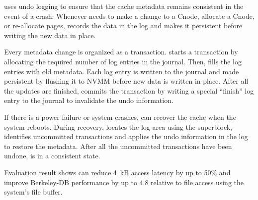 \CChell{} uses undo logging to ensure that the cache metadata remains
consistent in the event of a crash.  Whenever \drv{} needs to make
a change to a Cnode, allocate a Cnode, or re-allocate pages,
\drv{} records the data in the log and makes it persistent before writing
the new data in place.

Every metadata change is organized as a transaction.  \Drv{} starts
a transaction by allocating the required number of log entries in the journal.
Then, \drv{} fills the log entries with old metadata.
Each log entry is written to the journal and made persistent by flushing it
to NVMM before new data is written in-place.
After all the updates are finished, \drv{} commits the transaction
by writing a special ``finish'' log entry to the journal to invalidate the undo information.

If there is a power failure or system crashes, \drv{} can recover the cache
when the system reboots.  During recovery, \drv{} locates the log area using
the superblock,
identifies uncommitted transactions and applies the undo information in the log
to restore the metadata.
After all the uncommitted transactions have been undone, \CChell{} is in a
consistent state.

Evaluation result shows \CChell{} can
reduce 4~kB access latency by up to 50\% and improve Berkeley-DB performance
by up to 4.8\x{} relative to file access using the system's file buffer.

